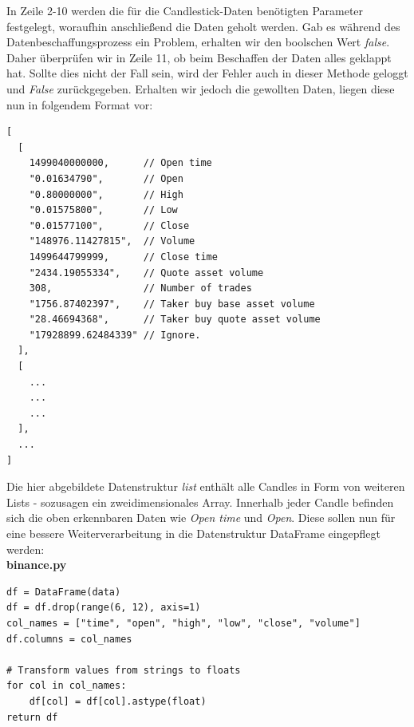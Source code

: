 \documentclass[oneside]{ausarbeitung}
\begin{document}
In Zeile 2-10 werden die für die Candlestick-Daten benötigten Parameter festgelegt, woraufhin anschließend die Daten geholt werden. Gab es während des Datenbeschaffungsprozess ein Problem, erhalten wir den boolschen Wert \textit{false}. Daher überprüfen wir in Zeile 11, ob beim Beschaffen der Daten alles geklappt hat. Sollte dies nicht der Fall sein, wird der Fehler auch in dieser Methode geloggt und \textit{False} zurückgegeben. Erhalten wir jedoch die gewollten Daten, liegen diese nun in folgendem Format vor: \\

\lstset{language=Python}
\lstset{frame=lines}
\lstset{basicstyle=\footnotesize}
\begin{lstlisting}
[
  [
    1499040000000,      // Open time
    "0.01634790",       // Open
    "0.80000000",       // High
    "0.01575800",       // Low
    "0.01577100",       // Close
    "148976.11427815",  // Volume
    1499644799999,      // Close time
    "2434.19055334",    // Quote asset volume
    308,                // Number of trades
    "1756.87402397",    // Taker buy base asset volume
    "28.46694368",      // Taker buy quote asset volume
    "17928899.62484339" // Ignore.
  ],
  [
  	...
  	...
  	...
  ],
  ...
]
\end{lstlisting}

Die hier abgebildete Datenstruktur \textit{list} enthält alle Candles in Form von weiteren Lists - sozusagen ein zweidimensionales Array. Innerhalb jeder Candle befinden sich die oben erkennbaren Daten wie \textit{Open time} und \textit{Open}. Diese sollen nun für eine bessere Weiterverarbeitung in die Datenstruktur DataFrame eingepflegt werden: \\

\lstset{language=Python}
\lstset{frame=lines}
\lstset{basicstyle=\footnotesize}
\textbf{binance.py}
\begin{lstlisting}
df = DataFrame(data)
df = df.drop(range(6, 12), axis=1)
col_names = ["time", "open", "high", "low", "close", "volume"]
df.columns = col_names

# Transform values from strings to floats
for col in col_names:
	df[col] = df[col].astype(float)
return df
\end{lstlisting}
\end{document}
